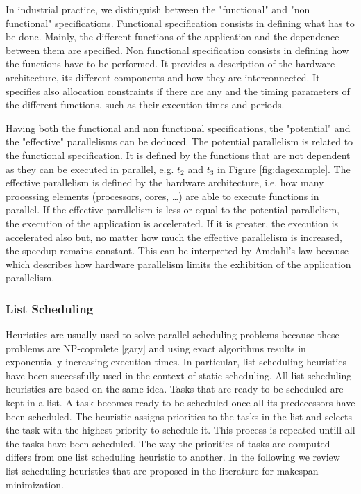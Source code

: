 In industrial practice, we distinguish between the "functional" and "non functional" specifications. Functional specification consists in defining what has to be done. Mainly, the different functions of the application and the dependence between them are specified. Non functional specification consists in defining how the functions have to be performed. It provides a description of the hardware architecture, its different components and how they are interconnected. It specifies also allocation constraints if there are any and the timing parameters of the different functions, such as their execution times and periods.

Having both the functional and non functional specifications, the "potential" and the "effective" parallelisms can be deduced. The potential parallelism is related to the functional specification. It is defined by the functions that are not dependent as they can be executed in parallel, e.g. $t_2$ and $t_3$ in Figure \ref{fig:dagexample}. The effective parallelism is defined by the hardware architecture, i.e. how many processing elements (processors, cores, \ldots) are able to execute functions in parallel. If the effective parallelism is less or equal to the potential parallelism, the execution of the application is accelerated. If it is greater, the execution is accelerated also but, no matter how much the effective parallelism is increased, the speedup remains constant. This can be interpreted by Amdahl's law because which describes how hardware parallelism limits the exhibition of the application parallelism.

  


\subsubsection{List Scheduling}

Heuristics are usually used to solve parallel scheduling problems because these problems are NP-copmlete [gary] and using exact algorithms results in exponentially increasing execution times. In particular, list scheduling heuristics have been successfully used in the context of static scheduling. All list scheduling heuristics are based on the same idea. Tasks that are ready to be scheduled are kept in a list. A task becomes ready to be scheduled once all its predecessors have been scheduled. The heuristic assigns priorities to the tasks in the list and selects the task with the highest priority to schedule it. This process is repeated untill all the tasks have been scheduled. The way the priorities of tasks are computed differs from one list scheduling heuristic to another. In the following we review list scheduling heuristics that are proposed in the literature for makespan minimization.

